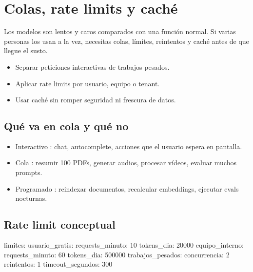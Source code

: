 \documentclass[11pt,a4paper]{book}
\begin{document}
\chapter{Colas, rate limits y caché}
Los modelos son lentos y caros comparados con una función normal. Si varias personas los usan a la vez, necesitas colas, límites, reintentos y caché antes de que llegue el susto.

\begin{itemize}\item Separar peticiones interactivas de trabajos pesados.\end{itemize}
\begin{itemize}\item Aplicar rate limits por usuario, equipo o tenant.\end{itemize}
\begin{itemize}\item Usar caché sin romper seguridad ni frescura de datos.\end{itemize}
\section{Qué va en cola y qué no}
\begin{itemize}\item Interactivo : chat, autocomplete, acciones que el usuario espera en pantalla.\end{itemize}
\begin{itemize}\item Cola : resumir 100 PDFs, generar audios, procesar vídeos, evaluar muchos prompts.\end{itemize}
\begin{itemize}\item Programado : reindexar documentos, recalcular embeddings, ejecutar evals nocturnas.\end{itemize}
\section{Rate limit conceptual}
\begin{codebox}
limites:
  usuario_gratis:
    requests_minuto: 10
    tokens_dia: 20000
  equipo_interno:
    requests_minuto: 60
    tokens_dia: 500000
  trabajos_pesados:
    concurrencia: 2
    reintentos: 1
    timeout_segundos: 300
\end{codebox}
\end{document}
